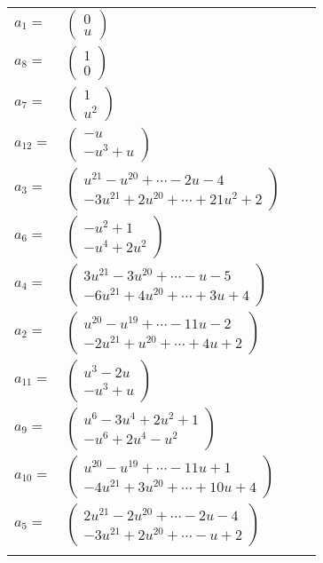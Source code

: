 \documentclass[1p]{elsarticle_modified}
\theoremstyle{definition}
\begin{document}
\begin{tabular}{m{7pt} m{180pt} m{7pt} m{180pt} }
\flushright $a_{1}=$&$\begin{pmatrix}0\\u\end{pmatrix}$ \\
\flushright $a_{8}=$&$\begin{pmatrix}1\\0\end{pmatrix}$ \\
\flushright $a_{7}=$&$\begin{pmatrix}1\\u^2\end{pmatrix}$ \\
\flushright $a_{12}=$&$\begin{pmatrix}- u\\- u^3+u\end{pmatrix}$ \\
\flushright $a_{3}=$&$\begin{pmatrix}u^{21}- u^{20}+\cdots-2 u-4\\-3 u^{21}+2 u^{20}+\cdots+21 u^2+2\end{pmatrix}$ \\
\flushright $a_{6}=$&$\begin{pmatrix}- u^2+1\\- u^4+2 u^2\end{pmatrix}$ \\
\flushright $a_{4}=$&$\begin{pmatrix}3 u^{21}-3 u^{20}+\cdots- u-5\\-6 u^{21}+4 u^{20}+\cdots+3 u+4\end{pmatrix}$ \\
\flushright $a_{2}=$&$\begin{pmatrix}u^{20}- u^{19}+\cdots-11 u-2\\-2 u^{21}+u^{20}+\cdots+4 u+2\end{pmatrix}$ \\
\flushright $a_{11}=$&$\begin{pmatrix}u^3-2 u\\- u^3+u\end{pmatrix}$ \\
\flushright $a_{9}=$&$\begin{pmatrix}u^6-3 u^4+2 u^2+1\\- u^6+2 u^4- u^2\end{pmatrix}$ \\
\flushright $a_{10}=$&$\begin{pmatrix}u^{20}- u^{19}+\cdots-11 u+1\\-4 u^{21}+3 u^{20}+\cdots+10 u+4\end{pmatrix}$ \\
\flushright $a_{5}=$&$\begin{pmatrix}2 u^{21}-2 u^{20}+\cdots-2 u-4\\-3 u^{21}+2 u^{20}+\cdots- u+2\end{pmatrix}$\\&\end{tabular}
\end{document}
